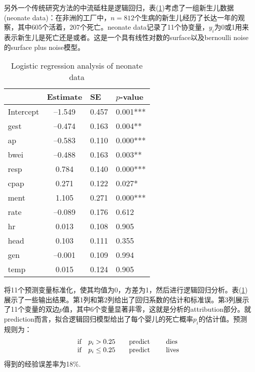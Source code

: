 \documentclass[lang=cn,11pt,a4paper,cite=authoryear]{elegantpaper}
\begin{document}
另外一个传统研究方法的中流砥柱是逻辑回归，表(\ref{table1})考虑了一组新生儿数据(neonate data)：在非洲的工厂中，$n=812$个生病的新生儿经历了长达一年的观察，其中605个活着，207个死亡。neonate data记录了11个协变量，$y_i$为0或1用来表示新生儿是死亡还是或者。这是一个具有线性对数的surface以及bernoulli noise的surface plus noise模型。
\begin{table}[H]
    \centering
    \caption{Logistic regression analysis of neonate data}
    \label{table1}
    \begin{tabular}{lcll}
    	\toprule
         & Estimate & SE & $p$-value \\ 
        \midrule
        Intercept & –1.549 & 0.457 & 0.001*** \\ 
        gest & –0.474 & 0.163 & 0.004** \\ 
        ap & –0.583 & 0.110 & 0.000*** \\ 
        bwei & –0.488 & 0.163 & 0.003** \\ 
        resp & 0.784 & 0.140 & 0.000*** \\ 
        cpap & 0.271 & 0.122 & 0.027* \\ 
        ment & 1.105 & 0.271 & 0.000*** \\ 
        rate & –0.089 & 0.176 & 0.612 \\ 
        hr & 0.013 & 0.108 & 0.905 \\ 
        head & 0.103 & 0.111 & 0.355 \\ 
        gen & –0.001 & 0.109 & 0.994 \\ 
        temp & 0.015 & 0.124 & 0.905 \\ 
        \bottomrule
    \end{tabular}
\end{table}

将11个预测变量标准化，使其均值为0，方差为1，然后进行逻辑回归分析。表(\ref{table1})展示了一些输出结果。第1列和第2列给出了回归系数的估计和标准误。第3列展示了11个变量的双边$p$值，其中6个变量显著非零，这就是分析的attribution部分。就prediction而言，拟合逻辑回归模型给出了每个婴儿的死亡概率$p_i$的估计值。预测规则为：
\begin{align}
\begin{array}{l}
\text{if}\quad p_i > 0.25 \qquad \text{predict \qquad dies} \\
\text{if}\quad p_i \leq 0.25 \qquad \text{predict \qquad lives}
\end{array}
\end{align}
得到的经验误差率为18\%.
\end{document}
